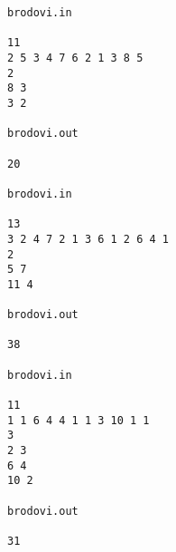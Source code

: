 \begin{verbatim}
brodovi.in 
 
11 
2 5 3 4 7 6 2 1 3 8 5 
2 
8 3 
3 2 
 
brodovi.out 
 
20 

brodovi.in 
 
13 
3 2 4 7 2 1 3 6 1 2 6 4 1 
2 
5 7 
11 4 
 
brodovi.out 
 
38

brodovi.in 
 
11 
1 1 6 4 4 1 1 3 10 1 1 
3 
2 3 
6 4 
10 2 
 
brodovi.out 
 
31 
\end{verbatim}